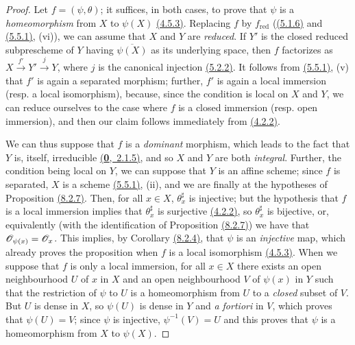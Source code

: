 \begin{proof}
\label{proof-prop-1.8.2.8}
Let $f=(\psi,\theta)$; it suffices, in both cases, to prove that $\psi$ is a
{\em homeomorphism} from $X$ to $\psi(X)$ \hyperref[env-1.4.5.3]{(4.5.3)}. Replacing $f$ by
$f_\text{red}$ (\hyperref[env-1.5.1.6]{(5.1.6)} and \hyperref[env-1.5.5.1]{(5.5.1)}, (vi)), we can assume that $X$
and $Y$ are {\em reduced}. If $Y'$ is the closed reduced subprescheme of $Y$
having $\overline{\psi(X)}$ as its underlying space, then $f$ factorizes as
$X\xrightarrow{f'}Y'\xrightarrow{j}Y$, where $j$ is the canonical injection
\hyperref[env-1.5.2.2]{(5.2.2)}. It follows from \hyperref[env-1.5.5.1]{(5.5.1)}, (v) that $f'$ is again a
separated morphism; further, $f'$ is again
a local immersion (resp. a local isomorphism), because, since the condition is local on $X$
and $Y$, we can reduce ourselves to the case where $f$ is a closed immersion (resp. open
immersion), and then our claim follows immediately from \hyperref[env-1.4.2.2]{(4.2.2)}.

We can thus suppose that $f$ is a {\em dominant} morphism, which leads to the
fact that $Y$ is, itself, irreducible \hyperref[env-0.2.1.5]{(\textbf{0},~2.1.5)}, and so $X$ and $Y$
are both {\em integral}. Further, the condition being local on $Y$, we can
suppose that $Y$ is an affine scheme; since $f$ is separated, $X$ is a scheme
\hyperref[env-1.5.5.1]{(5.5.1)}, (ii), and we are finally at the hypotheses of Proposition \hyperref[prop-1.8.2.7]{(8.2.7)}.
Then, for all $x\in X$, $\theta_x^\sharp$ is injective; but the hypothesis that $f$
is a local immersion implies that $\theta_x^\sharp$ is surjective \hyperref[env-1.4.2.2]{(4.2.2)}, so
$\theta_x^\sharp$ is bijective, or, equivalently (with the identification of Proposition
\hyperref[prop-1.8.2.7]{(8.2.7)}) we have that $\mathscr{O}_{\psi(x)}=\mathscr{O}_x$. This implies, by
Corollary \hyperref[cor-1.8.2.4]{(8.2.4)},
that $\psi$ is an {\em injective} map, which already proves the proposition
when $f$ is a local isomorphism \hyperref[env-1.4.5.3]{(4.5.3)}. When we suppose that $f$ is only
a local immersion, for all $x\in X$ there exists an open neighbourhood $U$ of
$x$ in $X$ and an open neighbourhood $V$ of $\psi(x)$ in $Y$ such that the
restriction of $\psi$ to $U$ is a homeomorphism from $U$ to a {\em closed}
subset of $V$. But $U$ is dense in $X$, so $\psi(U)$ is dense in $Y$ and
{\em a fortiori} in $V$, which proves that $\psi(U)=V$; since $\psi$ is
injective, $\psi^{-1}(V)=U$ and this proves that $\psi$ is a homeomorphism from
$X$ to $\psi(X)$.
\end{proof}

